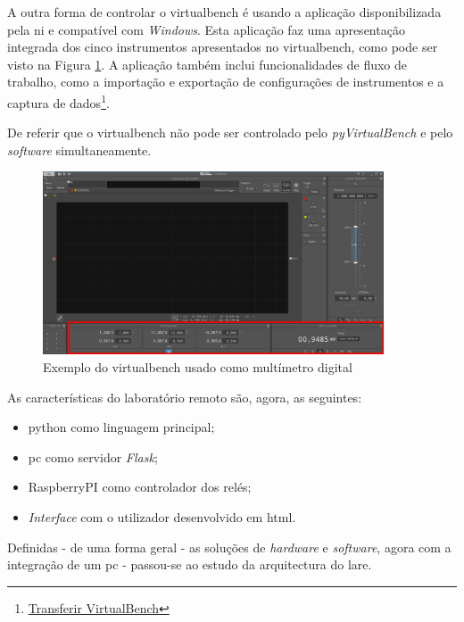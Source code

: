 A outra forma de controlar o \acrshort{virtualbench} é usando a aplicação disponibilizada pela \acrshort{ni}  e compatível com \textit{Windows}. Esta aplicação faz uma apresentação integrada dos cinco instrumentos apresentados no \acrshort{virtualbench}, como pode ser visto na Figura \ref{fig:leituraohm}. A aplicação também inclui funcionalidades de fluxo de trabalho, como a importação e exportação de configurações de instrumentos e a captura de dados\footnote{\href{https://www.ni.com/en/support/downloads/drivers/download.virtualbench-software.html}{Transferir VirtualBench}}.

De referir que o \acrshort{virtualbench} não pode ser controlado pelo \textit{pyVirtualBench} e pelo \textit{software} simultaneamente.

\begin{figure}[hbtp]
	\centering
	\includegraphics[width=0.9\textwidth]{figures/VB8012-OHM_Exemplo.png}
	\caption{Exemplo do \acrshort{virtualbench} usado como multímetro digital}
	\label{fig:leituraohm}
\end{figure}

As características do \acrshort{laboratório remoto} são, agora, as seguintes:
\begin{itemize}
	\item \gls{python} como linguagem principal;
	\item \acrshort{pc} como servidor \textit{Flask};
	\item \gls{RaspberryPI} como controlador dos relés;
	\item \textit{Interface} com o utilizador desenvolvido em \acrshort{html}.
\end{itemize}

Definidas - de uma forma geral - as soluções de \textit{hardware} e \textit{software}, agora com a integração de um \acrshort{pc} - passou-se ao estudo da arquitectura do \acrshort{lare}.

